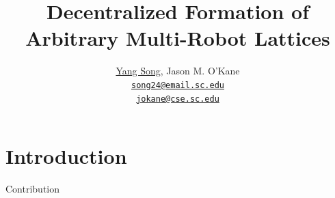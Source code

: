 \documentclass[10pt]{beamer}
\title{Decentralized Formation of Arbitrary Multi-Robot Lattices}
\author{
  \underline{Yang Song}, Jason M. O'Kane\\
  \href{mailto:song24@email.sc.edu}{{\tt song24@email.sc.edu} \\
  \href{mailto:jokane@cse.sc.edu}{\tt jokane@cse.sc.edu}}
}
\institute[
  Dept.\ of Computer Science and Engineering\\
  University of South Carolina
] %
{%
  Dept. of Computer Science and Engineering\\
  University of South Carolina
  
}
\begin{document}
\begin{frame}[plain] %
  \titlepage
\end{frame}

\section{Introduction}
\begin{frame}{Contribution}{}
\begin{block}{}
  \begin{columns}[T] %
    \begin{column}{.5\textwidth}
    \end{column}%
    \begin{column}{.5\textwidth}
    \end{column}%
  \end{columns} 
\end{block}
\end{frame}
\end{document}
